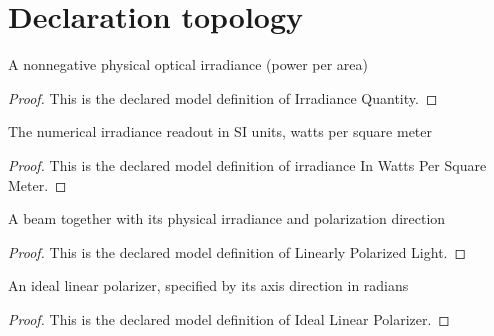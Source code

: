 \section{Declaration topology}
\begin{definition}
  \label{def:physics:phyx-mini-0094:phyxminiproblems-problemphyxmini0094-irradiancequantity}
  A nonnegative physical optical irradiance (power per area)
\end{definition}
\begin{proof}
  This is the declared model definition of Irradiance Quantity.
\end{proof}
\begin{definition}
  \label{def:physics:phyx-mini-0094:phyxminiproblems-problemphyxmini0094-irradianceinwattspersquaremeter}
  The numerical irradiance readout in SI units, watts per square meter
\end{definition}
\begin{proof}
  This is the declared model definition of irradiance In Watts Per Square Meter.
\end{proof}
\begin{definition}
  \label{def:physics:phyx-mini-0094:phyxminiproblems-problemphyxmini0094-linearlypolarizedlight}
  A beam together with its physical irradiance and polarization direction
\end{definition}
\begin{proof}
  This is the declared model definition of Linearly Polarized Light.
\end{proof}
\begin{definition}
  \label{def:physics:phyx-mini-0094:phyxminiproblems-problemphyxmini0094-ideallinearpolarizer}
  An ideal linear polarizer, specified by its axis direction in radians
\end{definition}
\begin{proof}
  This is the declared model definition of Ideal Linear Polarizer.
\end{proof}
